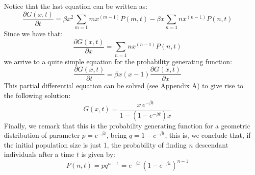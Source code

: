 Notice that the last equation can be written as:
\begin{equation}
\frac{\partial G(x,t)}{\partial t} = \beta x^2 \sum_{m=1} m x^{(m-1)} P(m,t) - \beta x \sum_{n=1}n x^{(n-1)} P(n,t)
\end{equation}
Since we have that:
\begin{equation}
\frac{\partial G(x,t)}{\partial x} = \sum_{n=1} n x^{(n-1)} P(n,t)
\end{equation}
we arrive to a quite simple equation for the probability generating function:
\begin{equation}
\label{eq:GenYule}
\frac{\partial G(x,t)}{\partial t} = \beta x (x-1) \frac{\partial G(x,t)}{\partial x}
\end{equation}
This partial differential equation can be solved (see Appendix A) to give rise to the following solution:
\begin{equation}
G(x,t) = \frac{x \, e^{-\beta t}}{1 - (1 -e^{-\beta t})x}
\end{equation}
Finally, we remark that this is the probability generating function for a geometric distribution of parameter $p=e^{-\beta t}$, being $q=1-e^{-\beta t}$, this is, we conclude that, if the initial population size is just 1, the probability of finding $n$ descendant individuals after a time $t$ is given by:
\begin{equation}
P(n,t) = p q^{n-1} = e^{-\beta t} \, (1 - e^{-\beta t})^{n-1}
\end{equation}

